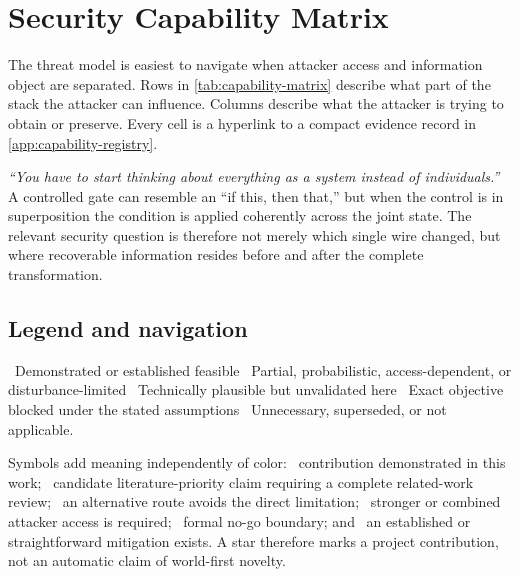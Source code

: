 \section{Security Capability Matrix}
\label{sec:capability-matrix}

The threat model is easiest to navigate when attacker access and information
object are separated. Rows in \cref{tab:capability-matrix} describe what part of
the stack the attacker can influence. Columns describe what the attacker is
trying to obtain or preserve. Every cell is a hyperlink to a compact evidence
record in \cref{app:capability-registry}.

\begin{claimbox}
\emph{``You have to start thinking about everything as a system instead of
individuals.''} A controlled gate can resemble an ``if this, then that,'' but
when the control is in superposition the condition is applied coherently across
the joint state. The relevant security question is therefore not merely which
single wire changed, but where recoverable information resides before and after
the complete transformation.
\end{claimbox}

\subsection{Legend and navigation}
\hypertarget{matrix:legend}{}

\noindent
{}\ Demonstrated or established feasible\quad
{}\ Partial, probabilistic, access-dependent, or disturbance-limited\quad
{}\ Technically plausible but unvalidated here\quad
{}\ Exact objective blocked under the stated assumptions\quad
{}\ Unnecessary, superseded, or not applicable.

\smallskip
\noindent Symbols add meaning independently of color:
\ourresult\ contribution demonstrated in this work;
\candidatepriority\ candidate literature-priority claim requiring a complete
related-work review;
\workaround\ an alternative route avoids the direct limitation;
\strongaccess\ stronger or combined attacker access is required;
\nogo\ formal no-go boundary; and
\mitigation\ an established or straightforward mitigation exists.
A star therefore marks a project contribution, not an automatic claim of
world-first novelty.

